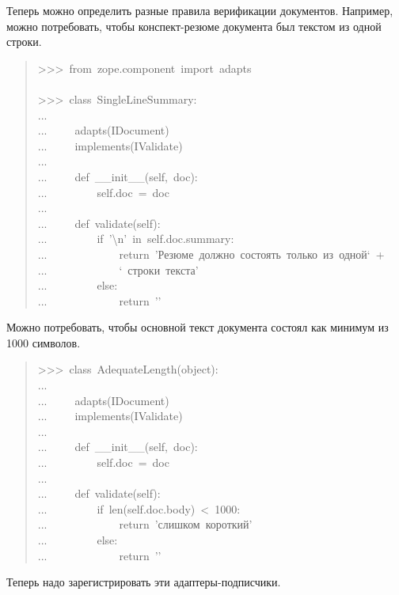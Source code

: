 \documentclass[14pt,a4paper,openany,twoside,final]{extbook}
\begin{document}
Теперь можно определить разные правила верификации документов.
Например, можно потребовать, чтобы конспект-резюме документа был
текстом из одной строки.

\begin{quote}{\ttfamily \raggedright \noindent
>{}>{}>~from~zope.component~import~adapts\\
~\\
>{}>{}>~class~SingleLineSummary:\\
...\\
...~~~~~adapts(IDocument)\\
...~~~~~implements(IValidate)\\
...\\
...~~~~~def~\_\_init\_\_(self,~doc):\\
...~~~~~~~~~self.doc~=~doc\\
...\\
...~~~~~def~validate(self):\\
...~~~~~~~~~if~'\textbackslash{}n'~in~self.doc.summary:\\
...~~~~~~~~~~~~~return~'Резюме~должно~состоять~только~из~одной`~+\\
...~~~~~~~~~~~~~`~строки~текста'\\
...~~~~~~~~~else:\\
...~~~~~~~~~~~~~return~'{}'
}
\end{quote}

Можно потребовать, чтобы основной текст документа состоял как минимум
из 1000 символов.

\begin{quote}{\ttfamily \raggedright \noindent
>{}>{}>~class~AdequateLength(object):\\
...\\
...~~~~~adapts(IDocument)\\
...~~~~~implements(IValidate)\\
...\\
...~~~~~def~\_\_init\_\_(self,~doc):\\
...~~~~~~~~~self.doc~=~doc\\
...\\
...~~~~~def~validate(self):\\
...~~~~~~~~~if~len(self.doc.body)~<~1000:\\
...~~~~~~~~~~~~~return~'слишком~короткий'\\
...~~~~~~~~~else:\\
...~~~~~~~~~~~~~return~'{}'
}
\end{quote}

Теперь надо зарегистрировать эти адаптеры-подписчики.
\end{document}
